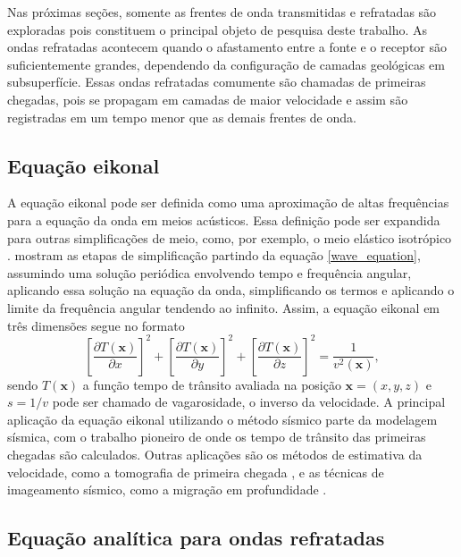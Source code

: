 Nas próximas seções, somente as frentes de onda transmitidas e refratadas são exploradas pois constituem o principal objeto de pesquisa deste trabalho. As ondas refratadas acontecem quando o afastamento entre a fonte e o receptor são suficientemente grandes, dependendo da configuração de camadas geológicas em subsuperfície. Essas ondas refratadas comumente são chamadas de primeiras chegadas, pois se propagam em camadas de maior velocidade e assim são registradas em um tempo menor que as demais frentes de onda.          

\subsection{Equação eikonal}

A equação eikonal pode ser definida como uma aproximação de altas frequências para a equação da onda em meios acústicos. Essa definição pode ser expandida para outras simplificações de meio, como, por exemplo, o meio elástico isotrópico \cite{cerveny2003seismic}.  mostram as etapas de simplificação partindo da equação \ref{wave_equation}, assumindo uma solução periódica envolvendo tempo e frequência angular, aplicando essa solução na equação da onda, simplificando os termos e aplicando o limite da frequência angular tendendo ao infinito. Assim, a equação eikonal em três dimensões segue no formato 
\begin{equation}
	\left[\dfrac{\partial T(\mathbf{x})}{\partial x}\right]^2 + \left[\dfrac{\partial T(\mathbf{x})}{\partial y}\right]^2 + \left[\dfrac{\partial T(\mathbf{x})}{\partial z}\right]^2 = \dfrac{1}{v^2(\mathbf{x})}, 	
	\label{eikonal_full}
\end{equation} 
\noindent sendo $T(\mathbf{x})$ a função tempo de trânsito avaliada na posição $\mathbf{x} = (x,y,z)$ e $s = 1/v$ pode ser chamado de vagarosidade, o inverso da velocidade. A principal aplicação da equação eikonal utilizando o método sísmico parte da modelagem sísmica, com o trabalho pioneiro de  onde os tempo de trânsito das primeiras chegadas são calculados. Outras aplicações são os métodos de estimativa da velocidade, como a tomografia de primeira chegada \cite{zhang1998nonlinear, sei1994gradient, tromp2005seismic, taillandier2009first},  e as técnicas de imageamento sísmico, como a migração em profundidade   \cite{gray1994kirchhoff, zhang2006refraction}.  
 
\subsection{Equação analítica para ondas refratadas}

